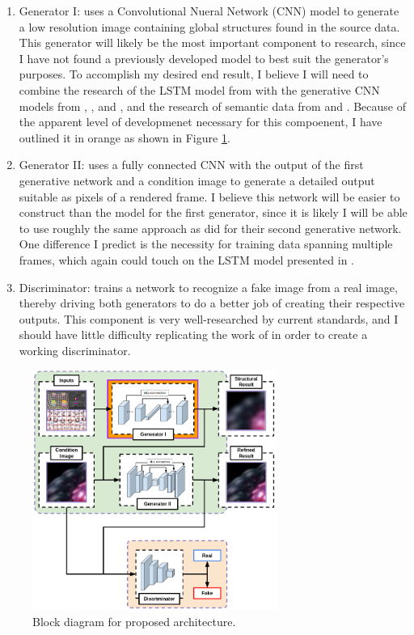 \documentclass[conference]{IEEEtran}
\begin{document}
\begin{enumerate}
\item Generator I: uses a Convolutional Nueral Network (CNN) model to generate a
low resolution image containing global structures found in the
source data. This generator will likely be the most important component to
research, since I have not found a previously developed model to best suit the
generator's purposes. To accomplish my desired end result,
I believe I will need to combine the research of the LSTM
model from \cite{ref:frame_prediction} with the
generative CNN models from \cite{ref:pixelcnn_decoders}, \cite{ref:pixelcnn++},
and \cite{ref:multi_source}, and the research of semantic data from
\cite{ref:image_captioning} and \cite{ref:posecnn}. Because of the apparent
level of developmenet necessary for this compoenent, I have
outlined it in orange as shown in Figure \ref{fig:block_diagram}.
\item Generator II: uses a fully connected CNN with the output of the first generative network and a
condition image to generate a detailed output suitable as pixels of a rendered
frame. I believe this network will be easier to construct than the model for the
first generator, since it is likely I will be able to use roughly the same approach as
\cite{ref:pose_guided} did for their second generative network. One difference I
predict is the necessity for training data spanning multiple frames, which again
could touch on the LSTM model presented in \cite{ref:frame_prediction}.
\item Discriminator: trains a network to recognize a fake image from a real
image, thereby driving both generators to do a better job of creating their
respective outputs. This component is very well-researched by current standards,
and I should have little difficulty replicating the work of
\cite{ref:pose_guided} in order to create a working discriminator.
\end{enumerate}

\begin{figure}[htbp]
\centerline{\includegraphics[width=8cm]{block_diagram.png}}
\caption{Block diagram for proposed architecture.}
\label{fig:block_diagram}
\end{figure}
\end{document}
